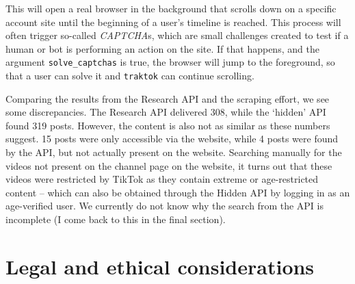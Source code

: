 \documentclass[
  nobib]{ccr}
\begin{document}
This will open a real browser in the background that scrolls down on a
specific account site until the beginning of a user's timeline is
reached. This process will often trigger so-called \emph{CAPTCHA}s,
which are small challenges created to test if a human or bot is
performing an action on the site. If that happens, and the argument
\texttt{solve\_captchas} is true, the browser will jump to the
foreground, so that a user can solve it and \texttt{traktok} can
continue scrolling.

Comparing the results from the Research API and the scraping effort, we
see some discrepancies. The Research API delivered 308, while the
`hidden' API found 319 posts. However, the content is also not as
similar as these numbers suggest. 15 posts were only accessible via the
website, while 4 posts were found by the API, but not actually present
on the website. Searching manually for the videos not present on the
channel page on the website, it turns out that these videos were
restricted by TikTok as they contain extreme or age-restricted content
-- which can also be obtained through the Hidden API by logging in as an
age-verified user. We currently do not know why the search from the API
is incomplete (I come back to this in the final section).

\section{Legal and ethical
considerations}\label{legal-and-ethical-considerations}
\end{document}
